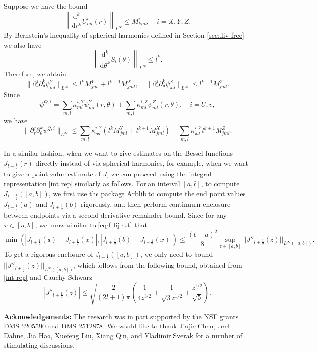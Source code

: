 \documentclass[11pt,a4paper]{article}
\numberwithin{equation}{section}
\newcommand{\mathd}{\mathrm{d}}
\begin{document}
Suppose we have the bound
\[ \left\| \frac{\mathd^k}{\mathd r^k} U_{m l}^i (r) \right\|_{L^{\infty}}
   \leqslant M^i_{k m l}, \quad i = X, Y, Z. \]
By Bernstein's inequality of spherical harmonics defined in Section \ref{sec:div-free}, we also have
\[ \left\| \frac{\mathd^k}{\mathd \theta^k} S_l (\theta) \right\|_{L^{\infty}}
   \leqslant l^k . \]
Therefore, we obtain
\[ \| \partial_r^j \partial_{\theta}^k \psi_{m l}^Y \|_{L^{\infty}} \leqslant
   l^k M^Y_{j m l} + l^{k + 1} M^X_{j m l}, \quad \| \partial_r^j
   \partial_{\theta}^k \psi_{m l}^Z \|_{L^{\infty}} \leqslant l^{k + 1} M^Z_{j
   m l} . \]
Since
\[ \psi^{Q, i} = \sum_{m, l} \kappa^{i, Y}_{m l} \psi_{m l}^Y (r, \theta) +
   \sum_{m, l} \kappa^{i, Z}_{m l} \psi_{m l}^Z (r, \theta), \quad i = U, v,
\]
we have
\[ \| \partial_r^j \partial_{\theta}^k \psi^{Q, i} \|_{L^{\infty}} \leqslant
   \sum_{m, l} \kappa^{i, Y}_{m l} (l^k M^Y_{j m l} + l^{k + 1} M^X_{j m l}) +
   \sum_{m, l} \kappa^{i, Z}_{m l} l^{k + 1} M^Z_{j m l} . \]


In a similar fashion, when we want to give estimates on the Bessel functions $J_{l+\frac12}(r)$ directly instead of via spherical harmonics, for example, when we want to give a point value estimate of $J$, we can proceed using the integral representation \eqref{int rep} similarly as follows.
For an interval $[a, b]$, to compute $J_{l+\frac{1}{2}}([a,b])$, we first use the package Arblib to compute the end point values $J_{l+\frac{1}{2}}(a)$ and $J_{l+\frac{1}{2}}(b)$ rigorously, and then perform continuum enclosure between endpoints via a second-derivative remainder bound. Since for any $x \in [a, b]$, we know similar to \eqref{eq:f Iij est} that
\[
\min\left(|J_{l+\frac{1}{2}}(a) - J_{l+\frac{1}{2}}(x)|, |J_{l+\frac{1}{2}}(b) - J_{l+\frac{1}{2}}(x)|\right) \leqslant \frac{(b-a)^2}{8} \sup_{z\in [a,b]} || J''_{l+\frac{1}{2}}(z)  ||_{L^\infty([a,b])}.
\]
To get a rigorous enclosure of $J_{l+\frac{1}{2}}([a,b])$, we only need to bound $|| J''_{l+\frac{1}{2}}(z)  ||_{L^\infty([a,b])}$, which follows from the following bound, obtained from \eqref{int rep} and Cauchy-Schwarz
\[
    \left|J''_{l+\frac{1}{2}}(z)\right| \leqslant \sqrt{\frac{2}{(2l+1)\pi}}\left( \frac{1}{4 z^{3/2}} + \frac{1}{\sqrt{3} z^{1/2}}  + \frac{z^{1/2}}{\sqrt{5}} \right).
\]

\vspace{0.2in}

\textbf{Acknowledgements:} The research was in part supported by the NSF grants DMS-2205590 and DMS-2512878. We would like to thank  Jiajie Chen, Joel Dahne, Jia Hao, Xuefeng Liu, Xiang Qin, and Vladimir Sverak for a number of stimulating discussions. 
\end{document}
